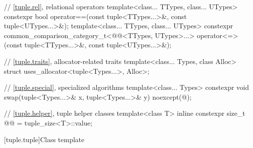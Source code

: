 \begin{codeblock}
{  // \ref{tuple.rel}, relational operators
  template<class... TTypes, class... UTypes>
    constexpr bool operator==(const tuple<TTypes...>&, const tuple<UTypes...>&);
  template<class... TTypes, class... UTypes>
    constexpr common_comparison_category_t<@@<TTypes, UTypes>...>
      operator<=>(const tuple<TTypes...>&, const tuple<UTypes...>&);

  // \ref{tuple.traits}, allocator-related traits
  template<class... Types, class Alloc>
    struct uses_allocator<tuple<Types...>, Alloc>;

  // \ref{tuple.special}, specialized algorithms
  template<class... Types>
    constexpr void swap(tuple<Types...>& x, tuple<Types...>& y) noexcept(@\seebelow@);

  // \ref{tuple.helper}, tuple helper classes
  template<class T>
    inline constexpr size_t @@ = tuple_size<T>::value;
}
\end{codeblock}

[tuple.tuple]{Class template }
%

